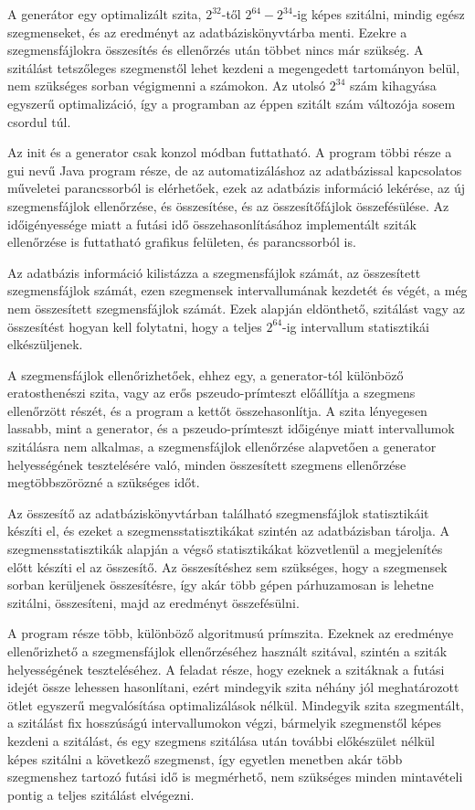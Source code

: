 A generátor egy optimalizált szita, $2^{32}$-től $2^{64}-2^{34}$-ig képes szitálni, mindig egész szegmenseket, és az eredményt az adatbáziskönyvtárba menti.
Ezekre a szegmensfájlokra összesítés és ellenőrzés után többet nincs már szükség.
A szitálást tetszőleges szegmenstől lehet kezdeni a megengedett tartományon belül, nem szükséges sorban végigmenni a számokon.
Az utolsó $2^{34}$ szám kihagyása egyszerű optimalizáció, így a programban az éppen szitált szám változója sosem csordul túl.

Az init és a generator csak konzol módban futtatható.
A program többi része a gui nevű Java program része, de az automatizáláshoz az adatbázissal kapcsolatos műveletei parancssorból is elérhetőek, ezek az adatbázis információ lekérése, az új szegmensfájlok ellenőrzése, és összesítése, és az összesítőfájlok összefésülése.
Az időigényessége miatt a futási idő összehasonlításához implementált sziták ellenőrzése is futtatható grafikus felületen, és parancssorból is.

Az adatbázis információ kilistázza a szegmensfájlok számát, az összesített szegmensfájlok számát, ezen szegmensek intervallumának kezdetét és végét, a még nem összesített szegmensfájlok számát.
Ezek alapján eldönthető, szitálást vagy az összesítést hogyan kell folytatni, hogy a teljes $2^{64}$-ig intervallum statisztikái elkészüljenek.

A szegmensfájlok ellenőrizhetőek, ehhez egy, a generator-tól különböző eratosthenészi szita, vagy az erős pszeudo-prímteszt\cite{pseudoprime}\cite{pseudoprimebase} előállítja a szegmens ellenőrzött részét, és a program a kettőt összehasonlítja.
A szita lényegesen lassabb, mint a generator, és a pszeudo-prímteszt időigénye miatt intervallumok szitálásra nem alkalmas, a szegmensfájlok ellenőrzése alapvetően a generator helyességének
tesztelésére való, minden összesített szegmens ellenőrzése megtöbbszörözné a szükséges időt.

Az összesítő az adatbáziskönyvtárban található szegmensfájlok statisztikáit készíti el, és ezeket a szegmensstatisztikákat szintén az adatbázisban tárolja.
A szegmensstatisztikák alapján a végső statisztikákat közvetlenül a megjelenítés előtt készíti el az összesítő.
Az összesítéshez sem szükséges, hogy a szegmensek sorban kerüljenek összesítésre, így akár több gépen párhuzamosan is lehetne szitálni, összesíteni, majd az eredményt összefésülni.

A program része több, különböző algoritmusú prímszita.
Ezeknek az eredménye ellenőrizhető a szegmensfájlok ellenőrzéséhez használt szitával, szintén a sziták helyességének teszteléséhez.
A feladat része, hogy ezeknek a szitáknak a futási idejét össze lehessen hasonlítani, ezért mindegyik szita néhány jól meghatározott ötlet egyszerű megvalósítása optimalizálások nélkül.
Mindegyik szita szegmentált, a szitálást fix hosszúságú intervallumokon végzi, bármelyik szegmenstől képes kezdeni a szitálást, és egy szegmens szitálása után további előkészület nélkül képes szitálni a következő szegmenst, így egyetlen menetben akár több szegmenshez tartozó futási idő is megmérhető, nem szükséges minden mintavételi pontig a teljes szitálást elvégezni.

